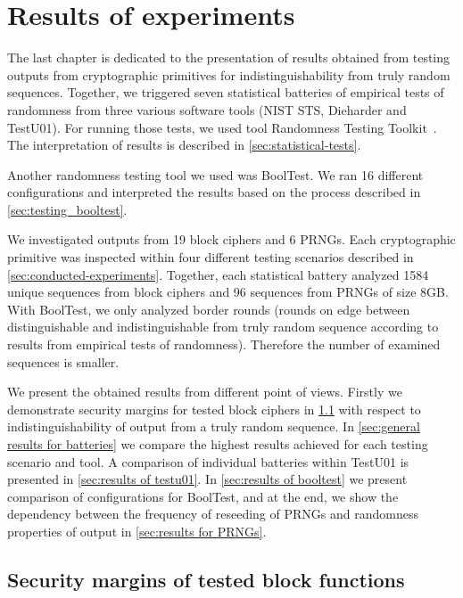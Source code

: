 \documentclass[
    digital,    %
    oneside,    %
    color,
    11pt,
    nocover,
    notable,
    nolof,
    nolot,
    final
]{fithesis3}
\renewcommand\_{\textunderscore\allowbreak}
\begin{document}
\chapter{Results of experiments}
\label{chap:results}

The last chapter is dedicated to the presentation of results obtained from testing outputs from cryptographic primitives for indistinguishability from truly random sequences. Together, we triggered seven statistical batteries of empirical tests of randomness from three various software tools (NIST STS, Dieharder and TestU01). For running those tests, we used tool Randomness Testing Toolkit~\cite{Obratil2017thesis}. The interpretation of results is described in \cref{sec:statistical-tests}.

Another randomness testing tool we used was BoolTest. We ran 16 different configurations and interpreted the results based on the process described in \cref{sec:testing_booltest}.

We investigated outputs from 19 block ciphers and 6 PRNGs. Each cryptographic primitive was inspected within four different testing scenarios described in \cref{sec:conducted-experiments}. Together, each statistical battery analyzed 1584 unique sequences from block ciphers and  96 sequences from PRNGs of size 8GB. With BoolTest, we only analyzed border rounds (rounds on edge between distinguishable and indistinguishable from truly random sequence according to results from empirical tests of randomness). Therefore the number of examined sequences is smaller.

We present the obtained results from different point of views. Firstly we demonstrate security margins for tested block ciphers in \cref{sec:security-margins-results} with respect to indistinguishability of output from a truly random sequence. In \cref{sec:general results for batteries} we compare the highest results achieved for each testing scenario and tool. A comparison of individual batteries within TestU01 is presented in \cref{sec:results of testu01}. In \cref{sec:results of booltest} we present comparison of configurations for BoolTest, and at the end, we show the dependency between the frequency of reseeding of PRNGs and randomness properties of output in \cref{sec:results for PRNGs}.
 
\section{Security margins of tested block functions}
\label{sec:security-margins-results}
\end{document}
